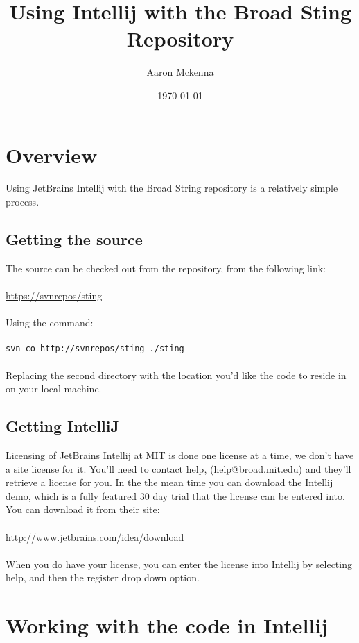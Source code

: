 \documentclass[11pt,fullpage]{article}
\begin{document}
\title{Using Intellij with the Broad Sting Repository}
\author{Aaron Mckenna}
\date{\today}
\maketitle

\section{Overview}
Using JetBrains Intellij with the Broad String repository is a relatively simple process.  

\subsection{Getting the source}
The source can be checked out from the repository, from the following link: \\ \\
\url{https://svnrepos/sting}\\ \\
Using the command:\\ \\
\texttt{svn co http://svnrepos/sting ./sting} \\ \\ 
Replacing the second directory with the location you'd like the code to reside in on your local machine.  
\subsection{Getting IntelliJ}
Licensing of JetBrains Intellij at MIT is done one license at a time, we don't have a site license for it.  You'll need to contact help,
(help@broad.mit.edu) and they'll retrieve a license for you.  In the the mean time you can download the Intellij demo, which is a 
fully featured 30 day trial that the license can be entered into.  You can download it from their site: \\ \\
\url{http://www.jetbrains.com/idea/download} \\ \\
When you do have your license, you can enter the license into Intellij by selecting help, and then the register drop down option. 
\section{Working with the code in Intellij}
\end{document}
